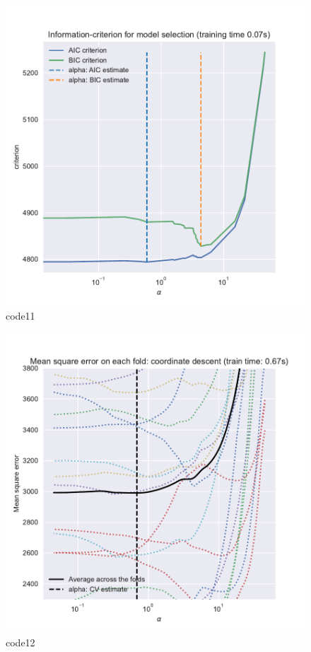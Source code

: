 \begin{PythonCode}\label{例8}
	
\end{PythonCode}

\begin{figure}[htbp]
	\centering
	\includegraphics[width=14cm]{codeimage/code11}
	\caption{code11}
	\label{code11}
\end{figure}

\begin{PythonCode}\label{例9}
	
\end{PythonCode}

\begin{figure}[htbp]
	\centering
	\includegraphics[width=14cm]{codeimage/code12}
	\caption{code12}
	\label{code12}
\end{figure}

